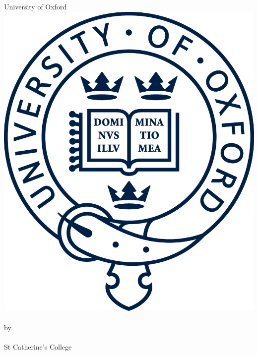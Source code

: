 \documentclass[a4paper,11pt,openany,extrafontsizes]{memoir}
\begin{document}
\pagestyle{plain}
\tightlists%

\begin{titlingpage}
  \begin{center}
    \vspace{1cm}
    \textsf{\Huge{University of Oxford}}\\
    \vspace{1cm}
    \includegraphics{branding/beltcrest.png}\\
    \vspace{2cm}
    \Huge{\thetitle}\\
    \vspace{2cm}
    \large{by\\[14pt]\theauthor\\[8pt]St Catherine's College}
    \vfill
\end{center}
\end{titlingpage}
\end{document}
